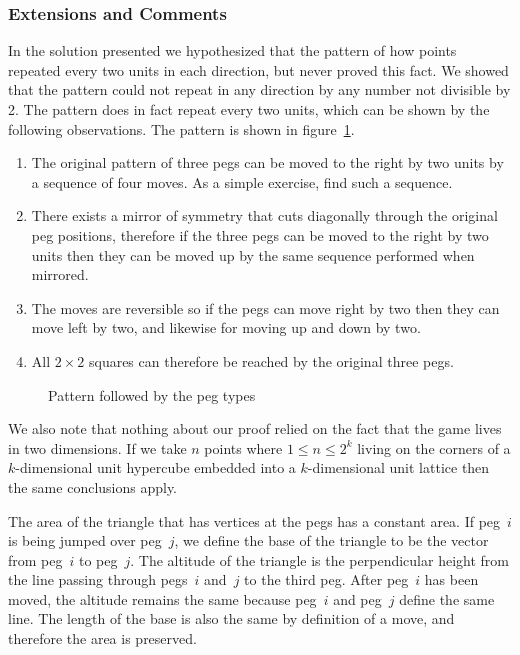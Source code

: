 \subsubsection{Extensions and Comments}

In the solution presented we hypothesized that the pattern of how points repeated every two units in each direction, but never proved this fact. We showed that the pattern could not repeat in any direction by any number not divisible by 2. The pattern does in fact repeat every two units, which can be shown by the following observations. The pattern is shown in figure~\ref{fig:ThreePegsOnASquare_Pattern}.

\begin{enumerate}
	\item The original pattern of three pegs can be moved to the right by two units by a sequence of four moves. As a simple exercise, find such a sequence.
	\item There exists a mirror of symmetry that cuts diagonally through the original peg positions, therefore if the three pegs can be moved to the right by two units then they can be moved up by the same sequence performed when mirrored.
	\item The moves are reversible so if the pegs can move right by two then they can move left by two, and likewise for moving up and down by two.
	\item All $2 \times 2$ squares can therefore be reached by the original three pegs.
\end{enumerate}

\begin{figure}[H]
	\begin{center}
		\caption{Pattern followed by the peg types}
		\label{fig:ThreePegsOnASquare_Pattern}
	\end{center}
\end{figure}

We also note that nothing about our proof relied on the fact that the game lives in two dimensions. If we take $n$ points where $1 \le n \le 2^k$ living on the corners of a $k$-dimensional unit hypercube embedded into a $k$-dimensional unit lattice then the same conclusions apply.

The area of the triangle that has vertices at the pegs has a constant area. If peg~$i$ is being jumped over peg~$j$, we define the base of the triangle to be the vector from peg~$i$ to peg~$j$. The altitude of the triangle is the perpendicular height from the line passing through pegs~$i$ and~$j$ to the third peg. After peg~$i$ has been moved, the altitude remains the same because peg~$i$ and peg~$j$ define the same line. The length of the base is also the same by definition of a move, and therefore the area is preserved.